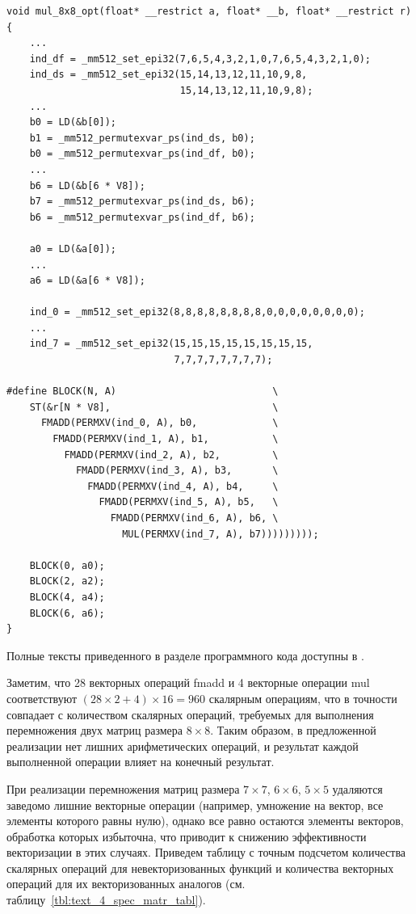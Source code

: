 \begin{lstlisting}[caption={Векторизованная версия перемножения матриц $8 \times 8$},label={lst:text_4_spec_matr_mul8x8_opt}]
void mul_8x8_opt(float* __restrict a, float* __b, float* __restrict r)
{
    ...
    ind_df = _mm512_set_epi32(7,6,5,4,3,2,1,0,7,6,5,4,3,2,1,0);
    ind_ds = _mm512_set_epi32(15,14,13,12,11,10,9,8,
                              15,14,13,12,11,10,9,8);
    ...
    b0 = LD(&b[0]);
    b1 = _mm512_permutexvar_ps(ind_ds, b0);
    b0 = _mm512_permutexvar_ps(ind_df, b0);
    ...
    b6 = LD(&b[6 * V8]);
    b7 = _mm512_permutexvar_ps(ind_ds, b6);
    b6 = _mm512_permutexvar_ps(ind_df, b6);

    a0 = LD(&a[0]);
    ...
    a6 = LD(&a[6 * V8]);

    ind_0 = _mm512_set_epi32(8,8,8,8,8,8,8,8,0,0,0,0,0,0,0,0);
    ...
    ind_7 = _mm512_set_epi32(15,15,15,15,15,15,15,15,
                             7,7,7,7,7,7,7,7);

#define BLOCK(N, A)                           \
    ST(&r[N * V8],                            \
      FMADD(PERMXV(ind_0, A), b0,             \
        FMADD(PERMXV(ind_1, A), b1,           \
          FMADD(PERMXV(ind_2, A), b2,         \
            FMADD(PERMXV(ind_3, A), b3,       \
              FMADD(PERMXV(ind_4, A), b4,     \
                FMADD(PERMXV(ind_5, A), b5,   \
                  FMADD(PERMXV(ind_6, A), b6, \
                    MUL(PERMXV(ind_7, A), b7)))))))));

    BLOCK(0, a0);
    BLOCK(2, a2);
    BLOCK(4, a4);
    BLOCK(6, a6);
}
\end{lstlisting}

Полные тексты приведенного в разделе программного кода доступны в \cite{iparGithub}.

Заметим, что 28 векторных операций fmadd и 4 векторные операции mul соответствуют $(28 \times 2 + 4) \times 16 = 960$ скалярным операциям, что в точности совпадает с количеством скалярных операций, требуемых для выполнения перемножения двух матриц размера $8 \times 8$.
Таким образом, в предложенной реализации нет лишних арифметических операций, и результат каждой выполненной операции влияет на конечный результат.

При реализации перемножения матриц размера $7 \times 7$, $6 \times 6$, $5 \times 5$ удаляются заведомо лишние векторные операции (например, умножение на вектор, все элементы которого равны нулю), однако все равно остаются элементы векторов, обработка которых избыточна, что приводит к снижению эффективности векторизации в этих случаях.
Приведем таблицу с точным подсчетом количества скалярных операций для невекторизованных функций и количества векторных операций для их векторизованных аналогов (см. таблицу~\ref{tbl:text_4_spec_matr_tabl}).

